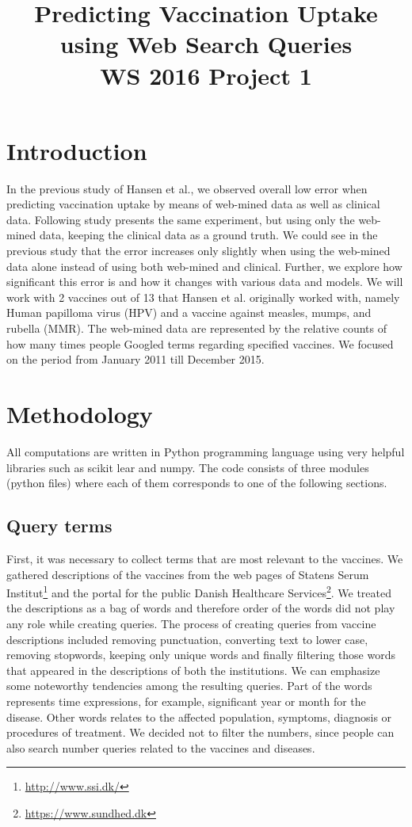 \documentclass{sig-alternate}
\begin{document}
\title{Predicting Vaccination Uptake using Web Search Queries\\WS 2016 Project 1}
\maketitle



\section{Introduction}
In the previous study of Hansen et al.\cite{H2016}, we observed overall low error when predicting vaccination uptake by means of web-mined data as well as clinical data.
Following study presents the same experiment, but using only the web-mined data, keeping the clinical data as a ground truth.
We could see in the previous study that the error increases only slightly when using the web-mined data alone instead of using both web-mined and clinical\cite{H2016}.
Further, we explore how significant this error is and how it changes with various data and models.
We will work with 2 vaccines out of 13 that Hansen et al. originally worked with, namely Human papilloma virus (HPV) and a vaccine against measles, mumps, and rubella (MMR).
The web-mined data are represented by the relative counts of how many times people Googled terms regarding specified vaccines.
We focused on the period from January 2011 till December 2015.

\section{Methodology}
All computations are written in Python programming language using very helpful libraries such as scikit lear\cite{scikit} and numpy\cite{numpy}.
The code consists of three modules (python files) where each of them corresponds to one of the following sections.
\subsection{Query terms}
First, it was necessary to collect terms that are most relevant to the vaccines.
We gathered descriptions of the vaccines from the web pages of Statens Serum Institut\footnote{\url{http://www.ssi.dk/}} and the portal for the public Danish Healthcare Services\footnote{\url{https://www.sundhed.dk}}.
We treated the descriptions as a bag of words and therefore order of the words did not play any role while creating queries.
The process of creating queries from vaccine descriptions included removing punctuation, converting text to lower case, removing stopwords, keeping only unique words and finally filtering those words that appeared in the descriptions of both the institutions.
We can emphasize some noteworthy tendencies among the resulting queries.
Part of the words represents time expressions, for example, significant year or month for the disease.
Other words relates to the affected population, symptoms, diagnosis or procedures of treatment.
We decided not to filter the numbers, since people can also search number queries related to the vaccines and diseases.
\end{document}
